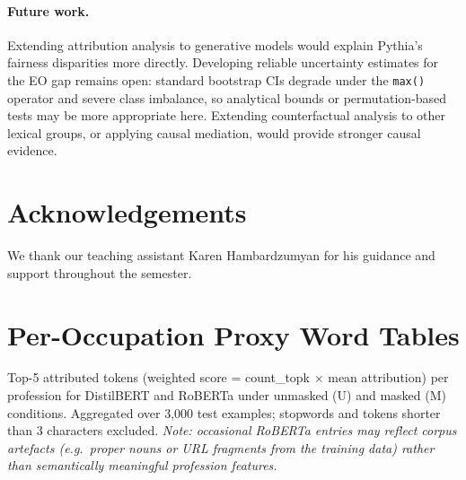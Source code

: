 \documentclass[11pt]{article}
\begin{document}
\paragraph{Future work.}
Extending attribution analysis to generative models would explain Pythia's fairness disparities more directly.
Developing reliable uncertainty estimates for the EO gap remains
open: standard bootstrap CIs degrade under the \texttt{max()} operator
and severe class imbalance, so analytical bounds or
permutation-based tests may be more appropriate here.
Extending counterfactual analysis to other lexical groups, or applying causal mediation, would provide stronger causal evidence.

\section*{Acknowledgements}
We thank our teaching assistant Karen Hambardzumyan for his guidance
and support throughout the semester.

\appendix


\section{Per-Occupation Proxy Word Tables}
\noindent Top-5 attributed tokens (weighted score = count\_topk $\times$ mean attribution)
per profession for DistilBERT and RoBERTa under unmasked (U) and masked (M) conditions.
Aggregated over 3,000 test examples; stopwords and tokens shorter than 3 characters excluded.
\textit{Note: occasional RoBERTa entries may reflect corpus artefacts (e.g.\ proper nouns or
URL fragments from the training data) rather than semantically meaningful profession features.}
\end{document}
